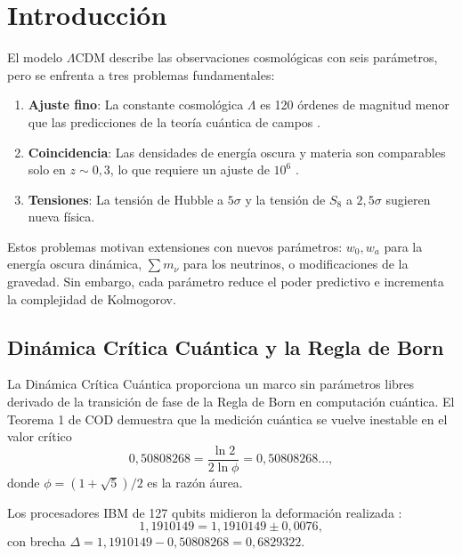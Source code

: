\documentclass[12pt, a4paper]{article}
\theoremstyle{miuThm}
\theoremstyle{remark}
\newcommand{\qborn}{1{,}1910149}
\newcommand{\qcrit}{0{,}50808268}
\begin{document}
\section{Introducción}
\label{sec:intro}

El modelo $\Lambda$CDM describe las observaciones cosmológicas con seis parámetros,
pero se enfrenta a tres problemas fundamentales:

\begin{enumerate}
\item \textbf{Ajuste fino}: La constante cosmológica $\Lambda$ es 120 órdenes de
      magnitud menor que las predicciones de la teoría cuántica de campos \cite{Weinberg1989}.
\item \textbf{Coincidencia}: Las densidades de energía oscura y materia son comparables
      solo en $z \sim 0{,}3$, lo que requiere un ajuste de $10^6$ \cite{Zlatev1999}.
\item \textbf{Tensiones}: La tensión de Hubble a $5\sigma$ \cite{Riess2022} y la
      tensión de $S_8$ a $2{,}5\sigma$ \cite{Heymans2021} sugieren nueva física.
\end{enumerate}

Estos problemas motivan extensiones con nuevos parámetros: $w_0, w_a$ para la
energía oscura dinámica, $\sum m_\nu$ para los neutrinos, o modificaciones de la
gravedad. Sin embargo, cada parámetro reduce el poder predictivo e incrementa la
complejidad de Kolmogorov.

\subsection{Dinámica Crítica Cuántica y la Regla de Born}

La Dinámica Crítica Cuántica proporciona un marco
sin parámetros libres derivado de la transición de fase de la Regla de Born en
computación cuántica. El Teorema 1 de COD demuestra que la medición cuántica
se vuelve inestable en el valor crítico
\begin{equation}
\qcrit = \frac{\ln 2}{2\ln\phi} = 0{,}50808268..., \label{eq:qcrit}
\end{equation}
donde $\phi = (1+\sqrt{5})/2$ es la razón áurea.

Los procesadores IBM de 127 qubits midieron la deformación realizada \cite{IBM2025}:
\begin{equation}
\qborn = 1{,}1910149 \pm 0{,}0076, \label{eq:qborn}
\end{equation}
con brecha $\Delta = \qborn - \qcrit = 0{,}6829322$.
\end{document}
